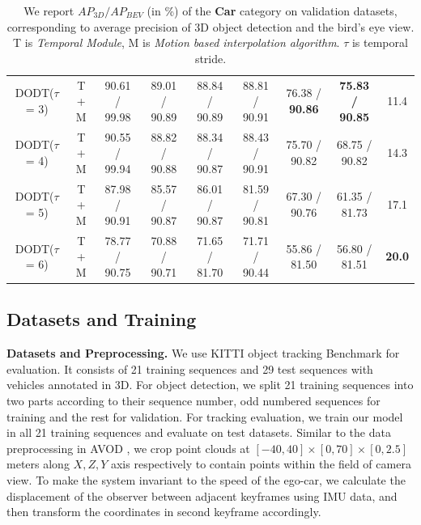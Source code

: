 \documentclass[letterpaper, 10pt, conference]{ieeeconf}  %
\begin{document}
\begin{table}
{\begin{tabular}{ccccccccc}
			\multicolumn{1}{c|}{DODT($\tau$ = 3)}     &\multicolumn{1}{c|}{T + M} & 90.61 / 99.98  & 89.01 / 90.89 & \multicolumn{1}{c|}{88.84 / 90.89}  & 88.81 / 90.91 & 76.38 / \textbf{90.86} & \multicolumn{1}{c|}{\textbf{75.83 / 90.85}}   & 11.4\\
			\multicolumn{1}{c|}{DODT($\tau$ = 4)}     &\multicolumn{1}{c|}{T + M} & 90.55 / 99.94  & 88.82 / 90.88 & \multicolumn{1}{c|}{88.34 / 90.87}  & 88.43 / 90.91 & 75.70 / 90.82 & \multicolumn{1}{c|}{68.75 / 90.82}   & 14.3\\
			\multicolumn{1}{c|}{DODT($\tau$ = 5)}     &\multicolumn{1}{c|}{T + M} & 87.98 / 90.91  & 85.57 / 90.87 & \multicolumn{1}{c|}{86.01 / 90.87}  & 81.59 / 90.81 & 67.30 / 90.76 & \multicolumn{1}{c|}{61.35 / 81.73}   & 17.1\\
			\multicolumn{1}{c|}{DODT($\tau$ = 6)}     &\multicolumn{1}{c|}{T + M} & 78.77 / 90.75  & 70.88 / 90.71 & \multicolumn{1}{c|}{71.65 / 81.70}  & 71.71 / 90.44 & 55.86 / 81.50 & \multicolumn{1}{c|}{56.80 / 81.51}   & \textbf{20.0} \\ \midrule
	\end{tabular}}
	\setlength{\abovecaptionskip}{-1pt}
	\caption{We report $AP_{3D}/AP_{BEV}$ (in \%) of the \textbf{Car} category on validation datasets, corresponding to average precision of 3D object detection and the bird's eye view. T is \textit{Temporal Module}, M is \textit{Motion based interpolation algorithm}. $\tau$ is temporal stride.} 
	\setlength{\belowcaptionskip}{1pt}
	\label{table:result_detection}
	\vspace{-0.6cm}
\end{table}

\subsection{Datasets and Training}

\textbf{Datasets and Preprocessing.} We use KITTI object tracking Benchmark \cite{geiger2013vision} for evaluation. It consists of 21 training sequences and 29 test sequences with vehicles annotated in 3D. For object detection, we split 21 training sequences into two parts according to their sequence number, odd numbered sequences for training and the rest for validation. For tracking evaluation, we train our model in all 21 training sequences and evaluate on test datasets. Similar to the data preprocessing in AVOD \cite{ku2018joint}, we crop point clouds at $[-40, 40] \times [0, 70] \times [0, 2.5]$ meters along $X, Z, Y$ axis respectively to contain points within the field of camera view. To make the system invariant to the speed of the ego-car, we calculate the displacement of the observer between adjacent keyframes using IMU data, and then transform the coordinates in second keyframe accordingly. 
\end{document}
